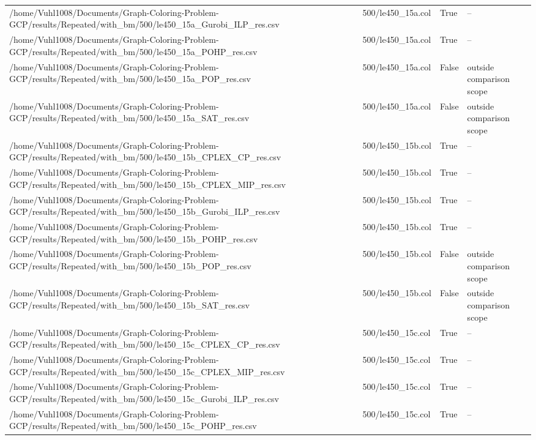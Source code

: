 \begin{table}[htbp]
\begin{tabular}{llll}
/home/Vuhl1008/Documents/Graph-Coloring-Problem-GCP/results/Repeated/with\_bm/500/le450\_15a\_Gurobi\_ILP\_res.csv & 500/le450\_15a.col & True & -- \\
/home/Vuhl1008/Documents/Graph-Coloring-Problem-GCP/results/Repeated/with\_bm/500/le450\_15a\_POHP\_res.csv & 500/le450\_15a.col & True & -- \\
/home/Vuhl1008/Documents/Graph-Coloring-Problem-GCP/results/Repeated/with\_bm/500/le450\_15a\_POP\_res.csv & 500/le450\_15a.col & False & outside comparison scope \\
/home/Vuhl1008/Documents/Graph-Coloring-Problem-GCP/results/Repeated/with\_bm/500/le450\_15a\_SAT\_res.csv & 500/le450\_15a.col & False & outside comparison scope \\
/home/Vuhl1008/Documents/Graph-Coloring-Problem-GCP/results/Repeated/with\_bm/500/le450\_15b\_CPLEX\_CP\_res.csv & 500/le450\_15b.col & True & -- \\
/home/Vuhl1008/Documents/Graph-Coloring-Problem-GCP/results/Repeated/with\_bm/500/le450\_15b\_CPLEX\_MIP\_res.csv & 500/le450\_15b.col & True & -- \\
/home/Vuhl1008/Documents/Graph-Coloring-Problem-GCP/results/Repeated/with\_bm/500/le450\_15b\_Gurobi\_ILP\_res.csv & 500/le450\_15b.col & True & -- \\
/home/Vuhl1008/Documents/Graph-Coloring-Problem-GCP/results/Repeated/with\_bm/500/le450\_15b\_POHP\_res.csv & 500/le450\_15b.col & True & -- \\
/home/Vuhl1008/Documents/Graph-Coloring-Problem-GCP/results/Repeated/with\_bm/500/le450\_15b\_POP\_res.csv & 500/le450\_15b.col & False & outside comparison scope \\
/home/Vuhl1008/Documents/Graph-Coloring-Problem-GCP/results/Repeated/with\_bm/500/le450\_15b\_SAT\_res.csv & 500/le450\_15b.col & False & outside comparison scope \\
/home/Vuhl1008/Documents/Graph-Coloring-Problem-GCP/results/Repeated/with\_bm/500/le450\_15c\_CPLEX\_CP\_res.csv & 500/le450\_15c.col & True & -- \\
/home/Vuhl1008/Documents/Graph-Coloring-Problem-GCP/results/Repeated/with\_bm/500/le450\_15c\_CPLEX\_MIP\_res.csv & 500/le450\_15c.col & True & -- \\
/home/Vuhl1008/Documents/Graph-Coloring-Problem-GCP/results/Repeated/with\_bm/500/le450\_15c\_Gurobi\_ILP\_res.csv & 500/le450\_15c.col & True & -- \\
/home/Vuhl1008/Documents/Graph-Coloring-Problem-GCP/results/Repeated/with\_bm/500/le450\_15c\_POHP\_res.csv & 500/le450\_15c.col & True & -- \\

\end{tabular}
\end{table}
